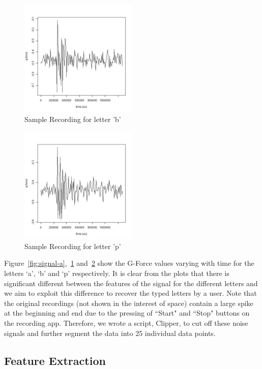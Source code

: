 \documentclass[11pt,conference]{IEEEtran}
\begin{document}
\begin{figure}
\centering
\includegraphics[width=0.5\textwidth]{img/b_147}
\caption{Sample Recording for letter 'b'}
\label{fig:signal-b}
\end{figure}

\begin{figure}
\centering
\includegraphics[width=0.5\textwidth]{img/p_566}
\caption{Sample Recording for letter 'p'}
\label{fig:signal-p}
\end{figure}

\noindent Figure~\ref{fig:signal-a},~\ref{fig:signal-b} and~\ref{fig:signal-p} show the G-Force values varying with time for the
letters `a', `b' and `p' respectively. It is clear from the plots that there is significant different between the features
of the signal for the different letters and we aim to exploit this difference to recover the typed letters by a user.
Note that the original recordings (not shown in the interest of space) contain a large spike at the beginning and end
due to the pressing of ``Start" and ``Stop" buttons on the recording app.
Therefore, we wrote a script, Clipper, to cut off these noise signals and further segment the data into 25 individual data points.

\subsection{Feature Extraction}
\end{document}
